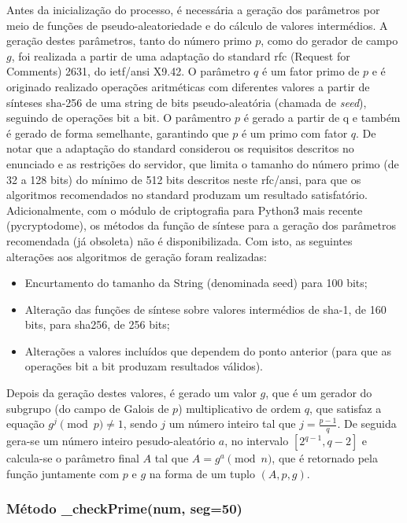 \documentclass{report}
\begin{document}
Antes da inicialização do processo, é necessária a geração dos parâmetros por meio de funções de pseudo-aleatoriedade e do cálculo de valores intermédios. A geração destes parâmetros, tanto do número primo $p$, como do gerador de campo $g$, foi realizada a partir de uma adaptação do standard \ac{rfc} (Request for Comments) 2631, do \ac{ietf}\cite{rfc}/\ac{ansi} X9.42\cite{ansi}. O parâmetro $q$ é um fator primo de $p$ e é originado realizado operações aritméticas com diferentes valores a partir de sínteses \ac{sha}-256 de uma string de bits pseudo-aleatória (chamada de \textit{seed}), seguindo de operações bit a bit. O parâmentro $p$ é gerado a partir de q e também é gerado de forma semelhante, garantindo que $p$ é um primo com fator $q$.
\newline
De notar que a adaptação do standard considerou os requisitos descritos no enunciado e as restrições do servidor, que limita o tamanho do número primo (de 32 a 128 bits) do mínimo de 512 bits descritos neste \ac{rfc}/\ac{ansi}, para que os algoritmos recomendados no standard produzam um resultado satisfatório. Adicionalmente, com o módulo de criptografia para Python3 mais recente (pycryptodome), os métodos da função de síntese para a geração dos parâmetros recomendada (já obsoleta) não é disponibilizada. Com isto, as seguintes alterações aos algoritmos de geração foram realizadas:
\begin{itemize}
    \item Encurtamento do tamanho da String (denominada seed) para 100 bits;
    \item Alteração das funções de síntese sobre valores intermédios de \ac{sha}-1, de 160 bits, para \ac{sha}256, de 256 bits;
    \item Alterações a valores incluídos que dependem do ponto anterior (para que as operações bit a bit produzam resultados válidos).
\end{itemize}
Depois da geração destes valores, é gerado um valor $g$, que é um gerador do subgrupo (do campo de Galois de $p$) multiplicativo de ordem $q$, que satisfaz a equação $g^j\pmod{p}\neq1$, sendo $j$ um número inteiro tal que $j=\frac{p-1}{q}$.
\newline
De seguida gera-se um número inteiro pesudo-aleatório $a$, no intervalo $[2^{q-1},q-2]$ e calcula-se o parâmetro final $A$ tal que $A=g^a\pmod{n}$, que é retornado pela função juntamente com $p$ e $g$ na forma de um tuplo $(A,p,g)$.

\subsubsection{Método \_checkPrime(num, seg=50)}
\end{document}

